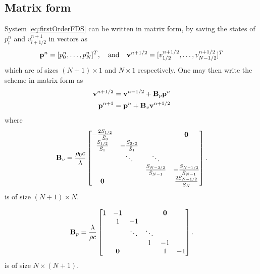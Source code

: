 {\subsection{Matrix form}
System \eqref{eq:firstOrderFDS} can be written in matrix form, by saving the states of $p_l^n$ and $v_{l+1/2}^{n+1}$ in vectors as 
\begin{equation}
    \mathbf{p}^n = [p_0^n, \hdots, p_N^n]^T, \quad \text{and} \quad \mathbf{v}^{n+1/2} = [v_{1/2}^{n+1/2}, \hdots, v_{N-1/2}^{n+1/2}]^T
\end{equation}
which are of sizes $(N+1)\times 1$ and $N\times 1$ respectively. One may then write the scheme in matrix form as  
\begin{subequations}
    \begin{align}
        \mathbf{v}^{n+1/2} &= \mathbf{v}^{n-1/2} + \mathbf{B}_p \mathbf{p}^n\\
        \mathbf{p}^{n+1} &= \mathbf{p}^n + \mathbf{B}_v \mathbf{v}^{n+1/2} 
    \end{align}
\end{subequations}
where
\begin{equation}
    \mathbf{B}_v = \frac{\rho_0 c}\lambda \begin{bmatrix}
        -\frac{2S_{1/2}}{\bar{S}_0}& & & \mathbf{0}\\
        \frac{S_{1/2}}{\bar{S}_1} & -\frac{S_{3/2}}{\bar{S}_1} & & \\
        & \ddots & \ddots & \\
        & & \frac{S_{N-3/2}}{\bar{S}_{N-1}} & -\frac{S_{N-1/2}}{\bar{S}_{N-1}} \\
        \mathbf{0} & & & \frac{2 S_{N-1/2}}{\bar{S}_N} \\
    \end{bmatrix}.
\end{equation}
is of size $(N+1) \times N$.

\begin{equation}
    \mathbf{B}_p = \frac{\lambda}{\rho c}\begin{bmatrix}
        1& -1& & & \mathbf{0} &\\
         & 1 & -1 & & & \\
       & & \ddots & \ddots & &\\
         & & & 1& -1& \\
        & \mathbf{0} & & & 1& -1 \\
    \end{bmatrix}.
\end{equation}
is of size $N \times (N+1)$.

}
